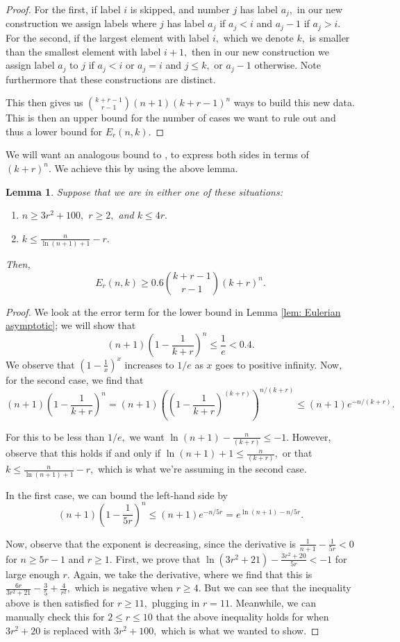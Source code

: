 \documentclass{article}
\newtheorem{lemma}[thm]{Lemma}
\theoremstyle{definition}
\theoremstyle{remark}
\begin{document}
\begin{proof}
\par For the first, if label $i$ is skipped, and number $j$ has label $a_j,$ in our new construction we assign labels where $j$ has label $a_j$ if $a_j < i$ and $a_j - 1$ if $a_j > i.$ For the second, if the largest element with label $i,$ which we denote $k,$ is smaller than the smallest element with label $i + 1,$ then in our new construction we assign label $a_j$ to $j$ if $a_j < i$ or $a_j = i$ and $j \leq k,$ or $a_j - 1$ otherwise. Note furthermore that these constructions are distinct.
\par This then gives us $\binom{k+r-1}{r-1} (n+1)(k+r-1)^n$ ways to build this new data. This is then an upper bound for the number of cases we want to rule out and thus a lower bound for $E_r(n, k).$
\end{proof}
We will want an analogous bound to \cite[Lemma C.3]{ls25}, to express both sides in terms of $(k+r)^n.$ We achieve this by using the above lemma.
\begin{lemma}\label{lem: more useable asymptotic}
Suppose that we are in either one of these situations:
\begin{enumerate}
    \item $n \geq 3r^2 + 100,$ $r \geq 2,$ and $k \leq 4r.$
    \item $k \leq \frac{n}{\ln(n+1) + 1} - r.$
\end{enumerate} Then, $$E_r(n, k) \geq 0.6 \binom{k+r-1}{r-1}(k+r)^n.$$ 
\end{lemma}
\begin{proof}
We look at the error term for the lower bound in Lemma \ref{lem: Eulerian asymptotic}; we will show that \[(n+1) \left(1 - \frac{1}{k+r}\right)^n \leq \frac{1}{e} < 0.4.\] We observe that $(1 - \frac{1}{x})^x$ increases to $1/e$ as $x$ goes to positive infinity. Now, for the second case, we find that \[(n+1) \left(1 - \frac{1}{k+r}\right)^n = (n+1)\left(\left(1 - \frac{1}{k+r}\right)^{(k+r)}\right)^{n/(k+r)} \leq (n+1) e^{-n/(k+r)}.\]
\par For this to be less than $1/e,$ we want $\ln(n+1) - \frac{n}{(k+r)} \leq -1.$ However, observe that this holds if and only if $\ln (n+1) + 1 \leq \frac{n}{(k+r)},$ or that $k \leq \frac{n}{\ln(n+1) + 1} - r,$ which is what we're assuming in the second case.
\par In the first case, we can bound the left-hand side by \[(n+1) \left(1 - \frac{1}{5r}\right)^n \leq (n+1) e^{-n/5r} = e^{\ln(n+1) - n/5r}.\]
\par Now, observe that the exponent is decreasing, since the derivative is $\frac{1}{n+1} - \frac{1}{5r} < 0$ for $n \geq 5r - 1$ and $r \geq 1.$ First, we prove that $\ln (3r^2 + 21) - \frac{3r^2 + 20}{5r} < -1$ for large enough $r.$ Again, we take the derivative, where we find that this is $\frac{6r}{3r^2 + 21} - \frac{3}{5} + \frac{4}{r^2},$ which is negative when $r \geq 4.$ But we can see that the inequality above is then satisfied for $r \geq 11,$ plugging in $r = 11.$ Meanwhile, we can manually check this for $2 \leq r \leq 10$ that the above inequality holds for when $3r^2 + 20$ is replaced with $3r^2 + 100,$ which is what we wanted to show.
\end{proof}
\end{document}
